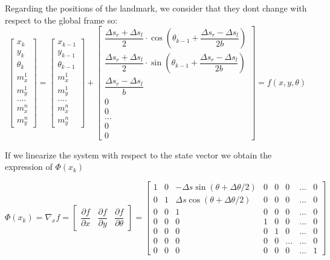 \documentclass[11pt,a4paper]{report}
\begin{document}
\begin{enumerate}
Regarding the positions of the landmark, we consider that they dont change with respect to the global frame so:
$$ \left [ \begin{array}{c} x_{k} \\ y_{k} \\ \theta_{k} \\ m_{x}^1\\ m_{y}^1 \\ .... \\ m_{x}^n \\ m_{y}^n \end{array}\right ]= 
\left [ \begin{array}{c} x_{k-1} \\ y_{k-1} \\ \theta_{k-1} \\ m_{x}^1\\ m_{y}^1 \\ .... \\ m_{x}^n \\ m_{y}^n \end{array}\right ] + 
\left [ \begin{array}{c} \dfrac{\Delta s_{r} + \Delta s_{l}}{2} \cdot \cos (\theta_{k-1} + \dfrac{\Delta s_{r} - \Delta s_{l}}{2b} ) \\ \dfrac{\Delta s_{r} + \Delta s_{l}}{2} \cdot \sin (\theta_{k-1} + \dfrac{\Delta s_{r} - \Delta s_{l}}{2b}) \\ \dfrac{\Delta s_{r} - \Delta s_{l}}{b} \\ 0 \\0 \\ ... \\ 0\\ 0\end{array}\right ] = f(x, y, \theta) $$  
	

If we linearize the system with respect to the state vector we obtain the expression of $\Phi(x_{k})$  

$$ \Phi(x_{k}) =\nabla_{x} f=  \left [ \begin{array}{ccc} \dfrac{\partial f}{\partial x} & \dfrac{\partial f}{\partial y} & \dfrac{\partial f}{\partial \theta} \end{array}\right ] =
\left [ \begin{array}{cccccccc} 1 & 0 & -\Delta s \sin (\theta + \Delta \theta /2) & 0 & 0 & 0 & ... & 0\\ 0 & 1 & \Delta s \cos (\theta + \Delta \theta /2)  & 0 & 0 & 0 & ... & 0 \\ 0 & 0 & 1  & 0 & 0 & 0 & ... & 0 \\ 
0 & 0 & 0 & 1 & 0 & 0 & ... & 0  \\ 0 & 0 & 0& 0 & 1 & 0  & ... & 0 \\ 0 & 0 & 0 & 0 & 0 & ...  & ... & 0 
\\ 0 & 0 & 0 & 0 & 0 & 0  & ... & 1  \end{array}\right ]  $$


\end{enumerate}
\end{document}
